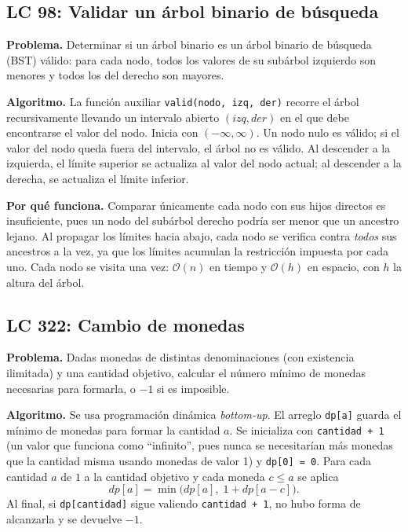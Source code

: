 \documentclass[11pt,letterpaper]{article}
\newcommand{\bigO}[1]{\ensuremath{\mathcal{O}(#1)}}
\begin{document}
\subsection{LC 98: Validar un árbol binario de búsqueda}

\textbf{Problema.} Determinar si un árbol binario es un árbol binario de búsqueda (BST) válido: para cada nodo, todos los valores de su subárbol izquierdo son menores y todos los del derecho son mayores.

\textbf{Algoritmo.} La función auxiliar \texttt{valid(nodo, izq, der)} recorre el árbol recursivamente llevando un intervalo abierto $(izq, der)$ en el que debe encontrarse el valor del nodo. Inicia con $(-\infty, \infty)$. Un nodo nulo es válido; si el valor del nodo queda fuera del intervalo, el árbol no es válido. Al descender a la izquierda, el límite superior se actualiza al valor del nodo actual; al descender a la derecha, se actualiza el límite inferior.

\textbf{Por qué funciona.} Comparar únicamente cada nodo con sus hijos directos es insuficiente, pues un nodo del subárbol derecho podría ser menor que un ancestro lejano. Al propagar los límites hacia abajo, cada nodo se verifica contra \emph{todos} sus ancestros a la vez, ya que los límites acumulan la restricción impuesta por cada uno. Cada nodo se visita una vez: \bigO{n} en tiempo y \bigO{h} en espacio, con $h$ la altura del árbol.

\subsection{LC 322: Cambio de monedas}

\textbf{Problema.} Dadas monedas de distintas denominaciones (con existencia ilimitada) y una cantidad objetivo, calcular el número mínimo de monedas necesarias para formarla, o $-1$ si es imposible.

\textbf{Algoritmo.} Se usa programación dinámica \emph{bottom-up}. El arreglo \texttt{dp[a]} guarda el mínimo de monedas para formar la cantidad $a$. Se inicializa con \texttt{cantidad + 1} (un valor que funciona como ``infinito'', pues nunca se necesitarían más monedas que la cantidad misma usando monedas de valor 1) y \texttt{dp[0] = 0}. Para cada cantidad $a$ de $1$ a la cantidad objetivo y cada moneda $c \le a$ se aplica
\[
dp[a] = \min\bigl(dp[a],\; 1 + dp[a-c]\bigr).
\]
Al final, si \texttt{dp[cantidad]} sigue valiendo \texttt{cantidad + 1}, no hubo forma de alcanzarla y se devuelve $-1$.
\end{document}
